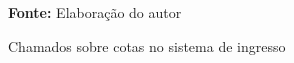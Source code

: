 \begin{figure}[t]
\centering

\caption{\textmd{Chamados sobre cotas no sistema de ingresso}}
\label{fig:chamados}
\par\medskip\textbf{Fonte:} Elaboração do autor \par\medskip

\end{figure}

